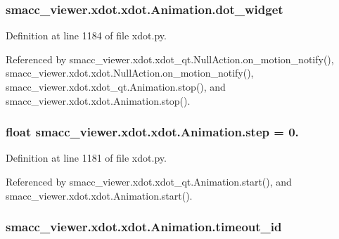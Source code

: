 \subsubsection[{\texorpdfstring{dot\+\_\+widget}{dot_widget}}]{\setlength{\rightskip}{0pt plus 5cm}smacc\+\_\+viewer.\+xdot.\+xdot.\+Animation.\+dot\+\_\+widget}\hypertarget{classsmacc__viewer_1_1xdot_1_1xdot_1_1Animation_a0fca25f51eb80a7ba49233a0729ab955}{}\label{classsmacc__viewer_1_1xdot_1_1xdot_1_1Animation_a0fca25f51eb80a7ba49233a0729ab955}


Definition at line 1184 of file xdot.\+py.



Referenced by smacc\+\_\+viewer.\+xdot.\+xdot\+\_\+qt.\+Null\+Action.\+on\+\_\+motion\+\_\+notify(), smacc\+\_\+viewer.\+xdot.\+xdot.\+Null\+Action.\+on\+\_\+motion\+\_\+notify(), smacc\+\_\+viewer.\+xdot.\+xdot\+\_\+qt.\+Animation.\+stop(), and smacc\+\_\+viewer.\+xdot.\+xdot.\+Animation.\+stop().

\subsubsection[{\texorpdfstring{step}{step}}]{\setlength{\rightskip}{0pt plus 5cm}float smacc\+\_\+viewer.\+xdot.\+xdot.\+Animation.\+step = 0.\hspace{0.3cm}{\ttfamily [static]}}\hypertarget{classsmacc__viewer_1_1xdot_1_1xdot_1_1Animation_afe2ecb1f30386b9d3758019d73417d9c}{}\label{classsmacc__viewer_1_1xdot_1_1xdot_1_1Animation_afe2ecb1f30386b9d3758019d73417d9c}


Definition at line 1181 of file xdot.\+py.



Referenced by smacc\+\_\+viewer.\+xdot.\+xdot\+\_\+qt.\+Animation.\+start(), and smacc\+\_\+viewer.\+xdot.\+xdot.\+Animation.\+start().

\subsubsection[{\texorpdfstring{timeout\+\_\+id}{timeout_id}}]{\setlength{\rightskip}{0pt plus 5cm}smacc\+\_\+viewer.\+xdot.\+xdot.\+Animation.\+timeout\+\_\+id}\hypertarget{classsmacc__viewer_1_1xdot_1_1xdot_1_1Animation_a34df6d9513d5da72a6b662e0f7536d5b}{}\label{classsmacc__viewer_1_1xdot_1_1xdot_1_1Animation_a34df6d9513d5da72a6b662e0f7536d5b}


